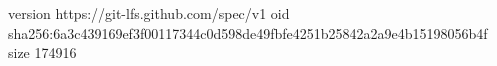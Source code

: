 version https://git-lfs.github.com/spec/v1
oid sha256:6a3c439169ef3f00117344c0d598de49fbfe4251b25842a2a9e4b15198056b4f
size 174916
